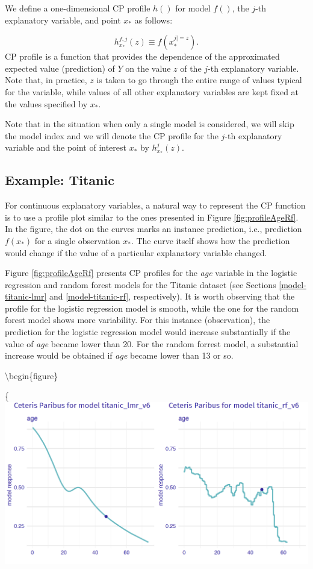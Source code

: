 \documentclass[12pt,]{krantz}
\theoremstyle{definition}
\theoremstyle{definition}
\theoremstyle{definition}
\theoremstyle{remark}
\begin{document}
We define a one-dimensional CP profile \(h()\) for model \(f()\), the
\(j\)-th explanatory variable, and point \(x_*\) as follows:

\[
h^{f,j}_{x_*}(z) \equiv f(x_*^{j|=z}).
\] CP profile is a function that provides the dependence of the
approximated expected value (prediction) of \(Y\) on the value \(z\) of
the \(j\)-th explanatory variable. Note that, in practice, \(z\) is
taken to go through the entire range of values typical for the variable,
while values of all other explanatory variables are kept fixed at the
values specified by \(x_*\).

Note that in the situation when only a single model is considered, we
will skip the model index and we will denote the CP profile for the
\(j\)-th explanatory variable and the point of interest \(x_*\) by
\(h^{j}_{x_*}(z)\).

\hypertarget{CPExample}{%
\subsection{Example: Titanic}\label{CPExample}}

For continuous explanatory variables, a natural way to represent the CP
function is to use a profile plot similar to the ones presented in
Figure \ref{fig:profileAgeRf}. In the figure, the dot on the curves
marks an instance prediction, i.e., prediction \(f(x_*)\) for a single
observation \(x_*\). The curve itself shows how the prediction would
change if the value of a particular explanatory variable changed.

Figure \ref{fig:profileAgeRf} presents CP profiles for the \emph{age}
variable in the logistic regression and random forest models for the
Titanic dataset (see Sections \ref{model-titanic-lmr} and
\ref{model-titanic-rf}, respectively). It is worth observing that the
profile for the logistic regression model is smooth, while the one for
the random forest model shows more variability. For this instance
(observation), the prediction for the logistic regression model would
increase substantially if the value of \emph{age} became lower than 20.
For the random forrest model, a substantial increase would be obtained
if \emph{age} became lower than 13 or so.

\textbackslash{}begin\{figure\}

\{\centering \includegraphics[width=0.7\linewidth]{figure/profile_age_rf}
\end{document}
